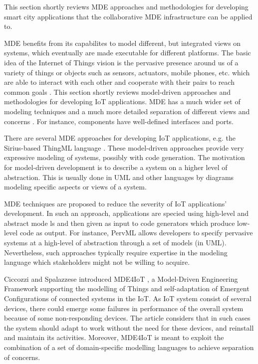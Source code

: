 This section shortly reviews MDE approaches and methodologies for developing smart city applications that the collaborative MDE infrastructure can be applied to.

MDE benefits from its capabilites to model different, but integrated views on systems, which eventually  are made executable for different platforms. The basic idea of the Internet of Things vision is the pervasive presence around us of a variety of things or objects such as sensors, actuators, mobile phones, etc. which are able to interact with each other and cooperate with their pairs to reach common goals \citep{Atzori+2010, Giusto+2010}. This section shortly reviews model-driven approaches and methodologies for developing IoT applications. MDE has a much wider set of modeling techniques and a much more detailed separation of different views and concerns \citep{KateuleWinter2018}. For instance, components have well-defined interfaces and ports.

There are several MDE approaches for developing IoT applications, e.g. the Sirius-based ThingML language \cite{Fleurey+2011}. These model-driven approaches provide very expressive modeling of systems, possibly with code generation. The motivation for model-driven development is to describe a system on a higher level of abstraction. This is usually done in UML and other languages by diagrams modeling specific aspects or views of a system.

MDE techniques are proposed to reduce the severity of IoT applications' development. In such an approach, applications are specied using high-level and abstract mode ls and then given as input to code generators which produce low-level code as output. For instance, PervML \cite{serral2010towards} allows developers to specify pervasive systems at a high-level of abstraction through a set of models (in UML). Nevertheless, such approaches typically require expertise in the modeling language which stakeholders might not be willing to acquire.

Ciccozzi and Spalazzese introduced MDE4IoT \cite{ciccozzi2016mde4iot}, a Model-Driven Engineering Framework supporting the modelling of Things and self-adaptation of Emergent Configurations of connected systems in the IoT. As IoT system consist of several devices, there could emerge some failures in performance of the overall system because of some non-responding devices. The article considers that in such cases the system should adapt to work without the need for these devices, and reinstall and maintain its activities. Moreover, MDE4IoT is meant to exploit the combination of a set of domain-specific modelling languages to achieve separation of concerns.


